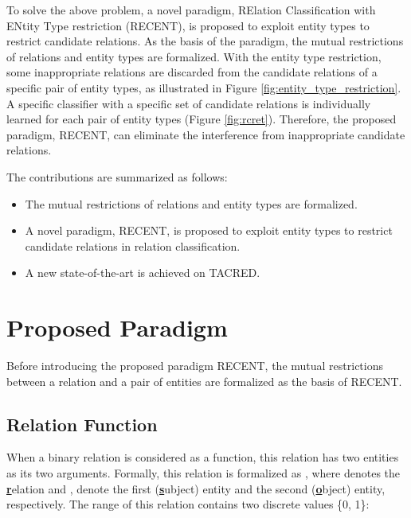 \documentclass[11pt,a4paper]{article}
\begin{document}
To solve the above problem, a novel paradigm, RElation Classification with ENtity Type restriction (RECENT), 
is proposed to exploit entity types to restrict candidate relations.
As the basis of the paradigm, the mutual restrictions of relations and entity types are formalized. 
With the entity type restriction, some inappropriate relations are discarded from the candidate relations of a specific pair of entity types, as illustrated in Figure  \ref{fig:entity_type_restriction}. 
A specific classifier with a specific set of candidate relations is individually learned for each pair of entity types (Figure \ref{fig:rcret}).
Therefore, the proposed paradigm, RECENT, can eliminate the interference from inappropriate candidate relations. 

The contributions are summarized as follows:
\begin{itemize}
	\setlength{\itemsep}{0pt}
\item The  mutual restrictions of relations and entity types are formalized.
	\item A novel paradigm, RECENT, is proposed to exploit entity types to restrict candidate relations in relation classification.
	\item A new state-of-the-art  is achieved on TACRED.
\end{itemize}








\section{Proposed Paradigm}
Before introducing the proposed paradigm RECENT, 
the mutual restrictions between a relation and a pair of entities are formalized as the basis of RECENT.

\subsection{Relation Function}
When a binary relation is considered as a function, 
this relation has two entities as its two arguments.  
Formally, this relation is formalized as , 
where  denotes the \textbf{\underline{r}}elation and ,  denote the first (\textbf{\underline{s}}ubject) entity and the second (\textbf{\underline{o}}bject) entity, respectively. 
The range of this relation contains two discrete values \{0, 1\}:
\end{document}
